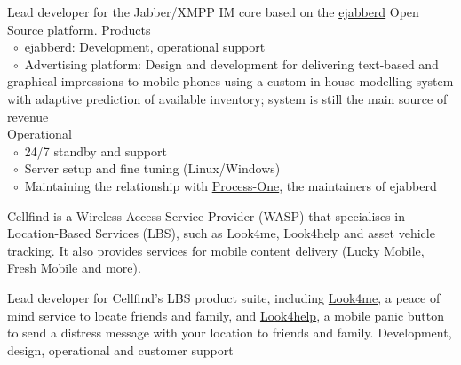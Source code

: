 \documentclass[10pt,a4paper,final]{columncv}
\newcommand{\cvitembullet}{~$\circ$~}
\newcommand{\cvitempbullet}{\phantom{\cvitembullet}}
\begin{document}
\begin{cvenv}
         {Lead developer for the Jabber/XMPP IM core based on the 
          \href{http://www.process-one.net/en/ejabberd/}{ejabberd} Open Source platform.}
         {Products \\
          \cvitembullet ejabberd: Development, operational support \\
          \cvitembullet Advertising platform: Design and development for delivering 
          \cvitempbullet text-based and graphical impressions to mobile phones using a 
          \cvitempbullet custom in-house modelling system with adaptive prediction of 
          \cvitempbullet available inventory; system is still the main source of revenue \\
          Operational \\
          \cvitembullet 24/7 standby and support \\
          \cvitembullet Server setup and fine tuning (Linux/Windows) \\
          \cvitembullet Maintaining the relationship with 
                   \href{http://www.process-one.net/en/}{Process-One}, the maintainers of 
          \cvitempbullet ejabberd}
\end{cvenv}

\pagebreak

\noindent Cellfind is a Wireless Access Service Provider (WASP) that specialises in 
Location-Based Services (LBS), such as Look4me, Look4help and asset vehicle tracking. It 
also provides services for mobile content delivery (Lucky Mobile, Fresh Mobile and more). 
\begin{cvenv}
         {Lead developer for Cellfind's LBS product suite, including  
         \href{http://www.look4me.co.za/}{Look4me}, a peace of mind 
         service to locate friends and family, and  
         \href{http://www.look4help.co.za/}{Look4help}, a mobile panic 
         button to send a distress message with your location to friends and family.}
         {Development, design, operational and customer support}
\end{cvenv}

\end{document}
